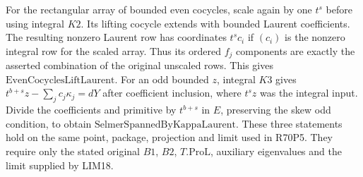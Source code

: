 For the rectangular array of bounded even cocycles, scale again
by one $t^s$ before using integral $K2$. Its lifting cocycle
extends with bounded Laurent coefficients. The resulting
nonzero Laurent row has coordinates $t^s c_i$ if $(c_i)$ is the
nonzero integral row for the scaled array. Thus its ordered
$f_j$ components are exactly the asserted combination of the
original unscaled rows. This gives $\mathrm{EvenCocyclesLiftLaurent}$.
For an odd bounded $z$, integral $K3$ gives
$t^{b+s}z-\sum_j c_j\kappa_j=dY$ after coefficient inclusion,
where $t^s z$ was the integral input. Divide the coefficients
and primitive by $t^{b+s}$ in $E$, preserving the skew odd
condition, to obtain $\mathrm{SelmerSpannedByKappaLaurent}$.
These three statements hold on the same point, package, projection
and limit used in R70P5. They require only the stated original
$B1$, $B2$, $T.\mathrm{ProL}$, auxiliary eigenvalues
and the limit supplied by LIM18.
